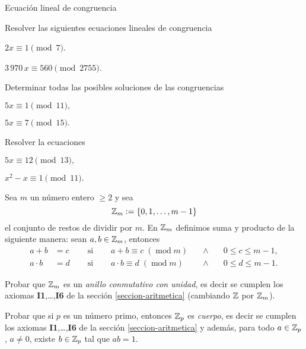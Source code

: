 \begin{section}{Ecuación lineal de congruencia}
\begin{enumex}
    \item Resolver las siguientes ecuaciones lineales de congruencia
    \begin{enumex}
        \item $2x \equiv 1 \pmod{7}$.
        \item $3\,970\, x \equiv 560 \pmod{2755}$.
    \end{enumex}


\item Determinar todas las posibles soluciones de las congruencias
\begin{enumex}
    \item  $5x\equiv1 \pmod{11},$
    
    \item  $5x\equiv 7 \pmod{15}.$
\end{enumex}
\item Resolver la ecuaciones
\begin{enumex}
\item $5x\equiv12 \pmod{13},$

\item $x^2-x \equiv 1 \pmod{11}.$
\end{enumex}

    \item\label{ejercicio-zm}  Sea $m$ un número entero $\ge 2$ y sea
    $$
    {\mathbb Z}_m := \{0,1,\ldots, m-1\}
    $$
    el conjunto de restos de dividir por $m$. En ${\mathbb Z}_m$ definimos suma y producto de la siguiente manera: sean $a,b \in {\mathbb Z}_m$,  entonces  
    \begin{equation*}
        \begin{array}{llllll}
            a+b &= c\quad &\text{ si }\quad &a+b \equiv c \; (\operatorname{mod}m) \quad&\wedge\quad&0 \le c \le m-1,\\
            a \cdot b &= d\quad &\text{ si }\quad &a\cdot b \equiv d \; (\operatorname{mod}m) &\wedge& 0 \le d \le m-1.
        \end{array} 
    \end{equation*}
    \begin{enumex}
        \item Probar que ${\mathbb Z}_m$ es un  \textit{anillo conmutativo con unidad},  es decir se cumplen los axiomas \textbf{I1},\ldots,\textbf{I6} de la sección \ref{seccion-aritmetica} (cambiando ${\mathbb Z}$ por  ${\mathbb Z}_m$). 
        \item Probar que si $p$ es un número primo,  entonces ${\mathbb Z}_p$ es \textit{cuerpo}, es decir  se cumplen los axiomas \textbf{I1},\ldots,\textbf{I6} de la sección \ref{seccion-aritmetica} y además, para todo $a \in {\mathbb Z}_p$, $a\ne 0$, existe $b \in {\mathbb Z}_p$ tal que $ab =1$. 
    \end{enumex}
\end{enumex}

\end{section}



